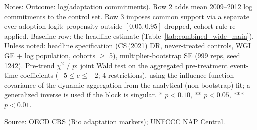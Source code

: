 \begin{table}[H]
\centering
\caption{Conditioning set and common support}
\label{tab:att_conditioning}
\begingroup\small
{}
\endgroup
\par\vspace{4pt}
\begin{minipage}{\linewidth}\footnotesize
Notes: Outcome: log(adaptation commitments). Row 2 adds mean 2009--2012 log commitments to the control set. Row 3 imposes common support via a separate ever-adoption logit; propensity outside $[0.05, 0.95]$ dropped, cohort rule re-applied. Baseline row: the headline estimate (Table~\ref{tab:combined_wide_main}). Unless noted: headline specification (CS\,(2021) DR, never-treated controls, WGI GE + log population, cohorts $\geq$ 5), multiplier-bootstrap SE (999 reps, seed 1242). Pre-trend $\chi^2$ / $p$: joint Wald test on the aggregated pre-treatment event-time coefficients ($-5 \leq e \leq -2$; 4 restrictions), using the influence-function covariance of the dynamic aggregation from the analytical (non-bootstrap) fit; a generalized inverse is used if the block is singular. * $p<0.10$, ** $p<0.05$, *** $p<0.01$.\par
Source: OECD CRS (Rio adaptation markers); UNFCCC NAP Central.
\end{minipage}
\end{table}
